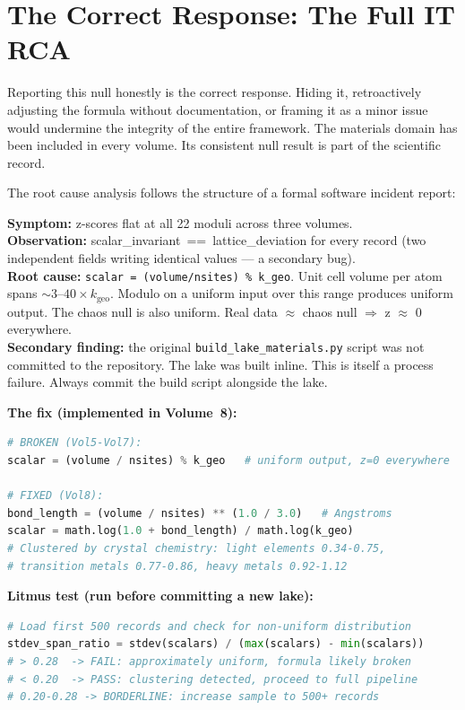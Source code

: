 \documentclass[11pt, letterpaper, openany]{book}
\begin{document}
\section*{The Correct Response: The Full IT RCA}

Reporting this null honestly is the correct response. Hiding it, retroactively adjusting
the formula without documentation, or framing it as a minor issue would undermine the
integrity of the entire framework. The materials domain has been included in every
volume. Its consistent null result is part of the scientific record.

The root cause analysis follows the structure of a formal software incident report:

\textbf{Symptom:} z-scores flat at all 22 moduli across three volumes.\\
\textbf{Observation:} scalar\_invariant~==~lattice\_deviation for every record (two
independent fields writing identical values --- a secondary bug).\\
\textbf{Root cause:} \texttt{scalar = (volume/nsites) \% k\_geo}. Unit cell volume
per atom spans $\sim 3$--$40 \times k_\text{geo}$. Modulo on a uniform input over
this range produces uniform output. The chaos null is also uniform. Real data $\approx$
chaos null $\Rightarrow$ z $\approx$ 0 everywhere.\\
\textbf{Secondary finding:} the original \texttt{build\_lake\_materials.py} script was
not committed to the repository. The lake was built inline. This is itself a process
failure. Always commit the build script alongside the lake.

\textbf{The fix (implemented in Volume~8):}

\begin{lstlisting}[language=Python]
# BROKEN (Vol5-Vol7):
scalar = (volume / nsites) % k_geo   # uniform output, z=0 everywhere

# FIXED (Vol8):
bond_length = (volume / nsites) ** (1.0 / 3.0)   # Angstroms
scalar = math.log(1.0 + bond_length) / math.log(k_geo)
# Clustered by crystal chemistry: light elements 0.34-0.75,
# transition metals 0.77-0.86, heavy metals 0.92-1.12
\end{lstlisting}

\textbf{Litmus test (run before committing a new lake):}

\begin{lstlisting}[language=Python]
# Load first 500 records and check for non-uniform distribution
stdev_span_ratio = stdev(scalars) / (max(scalars) - min(scalars))
# > 0.28  -> FAIL: approximately uniform, formula likely broken
# < 0.20  -> PASS: clustering detected, proceed to full pipeline
# 0.20-0.28 -> BORDERLINE: increase sample to 500+ records
\end{lstlisting}
\end{document}
